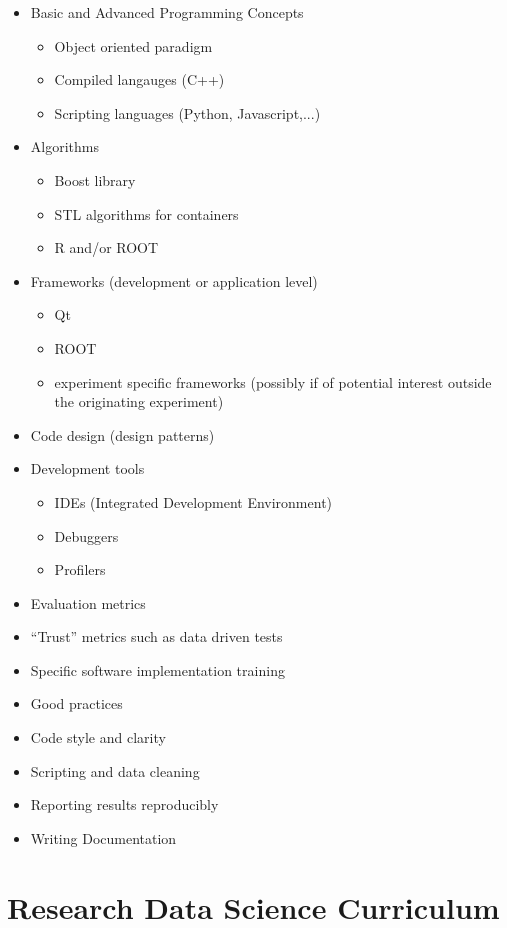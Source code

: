 \documentclass[12pt,a4paper]{article}
\begin{document}
\begin{appendices}
\begin{itemize}
   \item Basic and Advanced Programming Concepts
   \begin{itemize}
      \item Object oriented paradigm
      \item Compiled langauges (C++)
      \item Scripting languages (Python, Javascript,...)
   \end{itemize}
   \item Algorithms 
   \begin{itemize}
      \item Boost library
      \item STL algorithms for containers
      \item R and/or ROOT
   \end{itemize}
   \item Frameworks (development or application level)
   \begin{itemize}
      \item Qt
      \item ROOT
      \item experiment specific frameworks (possibly if of potential interest outside the originating experiment)
   \end{itemize}
   \item Code design (design patterns)
   \item Development tools
   \begin{itemize}
      \item IDEs (Integrated Development Environment)
      \item Debuggers
      \item Profilers
   \end{itemize}
   \item Evaluation metrics
   \item “Trust” metrics such as data driven tests
   \item Specific software implementation training
   \item Good practices 
   \item Code style and clarity
   \item Scripting and data cleaning
   \item Reporting results reproducibly
   \item Writing Documentation
\end{itemize}


\hypertarget{appendix-b}{%
\section{Research Data Science Curriculum}\label{appendix-b}}


\end{appendices}
\end{document}
